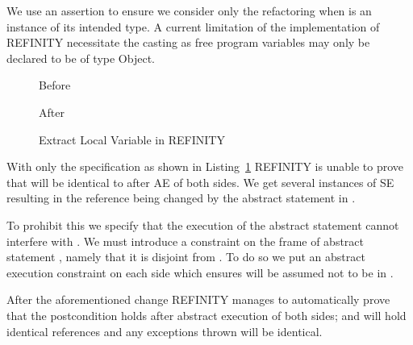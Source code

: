 We use an assertion to ensure we consider only the refactoring when  is an instance of its intended type.
A current limitation of the implementation of REFINITY necessitate the casting  as free program variables may only be declared to be of type Object.
\begin{figure}[tbp]
  \captionsetup{type=lstlisting}
  \centering
  \begin{sublstlisting}[b]{.34\linewidth}
    
    \vspace{-2mm}
    \caption{Before}
    \label{lst:ExtractVariable-refinity-before}
  \end{sublstlisting}\hspace{1cm}
  \begin{sublstlisting}[b]{.34\linewidth}
    
    \vspace{-2mm}
    \caption{After}
    \label{lst:ExtractVariable-refinity-after}
  \end{sublstlisting}\vspace{4mm}
\caption{Extract Local Variable in REFINITY}
\label{lst:ExtractVariable-refinity}
\end{figure}
With only the specification as shown in Listing~\ref{lst:ExtractVariable-refinity} REFINITY is unable to prove that  will be identical to  after AE of both sides.
We get several instances of SE resulting in the reference  being changed by the abstract statement  in .

To prohibit this we specify that the execution of the abstract statement  cannot interfere with .
We must introduce a constraint on the frame  of abstract statement , namely that it is disjoint from .
To do so we put an abstract execution constraint  on each side which ensures 
will be assumed not to be in .

After the aforementioned change REFINITY manages to automatically prove that the postcondition holds after abstract execution of both sides;
 and  will hold identical references and any exceptions thrown will be identical.



